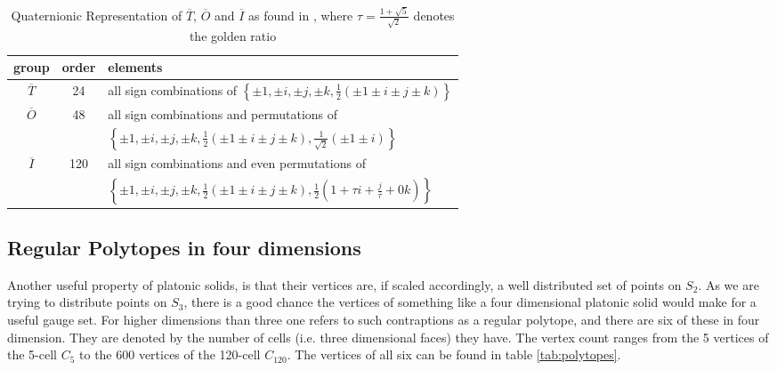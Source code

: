 \begin{table}
 \centering
 \begin{tabu}{c|c|l}
  group          & order & elements                                                                                                                                                   \\
  \hline
  $\overline{T}$ & 24    & all sign combinations of $\left\{\pm 1, \pm i, \pm j, \pm k, \frac{1}{2}\left( \pm 1 \pm i \pm j \pm k \right) \right\} $                                  \\
  \hline
  $\overline{O}$ & 48    & all sign combinations and permutations of                                                                                                                  \\
                 &       & $\left\{\pm 1, \pm i, \pm j, \pm k, \frac{1}{2}\left( \pm 1 \pm i \pm j \pm k \right) , \frac{1}{\sqrt{2}}\left( \pm 1 \pm i \right) \right\} $            \\
  \hline
  $\overline{I}$ & 120   & all sign combinations and even permutations of                                                                                                         \\
                 &       & $\left\{\pm 1, \pm i, \pm j, \pm k, \frac{1}{2}\left( \pm 1 \pm i \pm j \pm k \right) , \frac{1}{2}\left(1+\tau i + \frac{j}{\tau} + 0k \right) \right\} $ \\
 \end{tabu}
 \caption{Quaternionic Representation of $\overline{T}$, $\overline{O}$ and $\overline{I}$ as found in \cite{duval:1964}, where $\tau= \frac{1+\sqrt{5}}{\sqrt{2}}$ denotes the golden ratio}
 \label{tab:subgroups}
\end{table}

\subsection{Regular Polytopes in four dimensions}

Another useful property of platonic solids, is that their vertices are, if scaled accordingly, a well distributed set of points on $S_2$. As we are trying to distribute points on $S_3$, there is a good chance the vertices of something like a four dimensional platonic solid would make for a useful gauge set. For higher dimensions than three one refers to such contraptions as a regular polytope, and there are six of these in four dimension. They are denoted by the number of cells (i.e. three dimensional faces) they have. The vertex count ranges from the 5 vertices of the 5-cell $C_5$ to the 600 vertices of the 120-cell $C_{120}$. The vertices of all six can be found in table \ref{tab:polytopes}.

